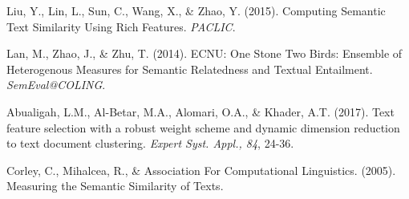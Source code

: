\documentclass{article} %
\begin{document}
\begin{thebibliography}{9}
    Liu, Y., Lin, L., Sun, C., Wang, X., \& Zhao, Y. (2015). Computing Semantic Text Similarity Using Rich Features. {\it PACLIC}.
   
	 Lan, M., Zhao, J., \& Zhu, T. (2014). ECNU: One Stone Two Birds: Ensemble of Heterogenous Measures for Semantic Relatedness and Textual Entailment. {\it SemEval@COLING}. 
    
    Abualigah, L.M., Al-Betar, M.A., Alomari, O.A., \& Khader, A.T. (2017). Text feature selection with a robust weight scheme and dynamic dimension reduction to text document clustering. {\it Expert Syst. Appl., 84}, 24-36.
   
    Corley, C., Mihalcea, R., \& Association For Computational Linguistics. (2005). Measuring the Semantic Similarity of Texts.
    
\end{thebibliography}
\end{document}
